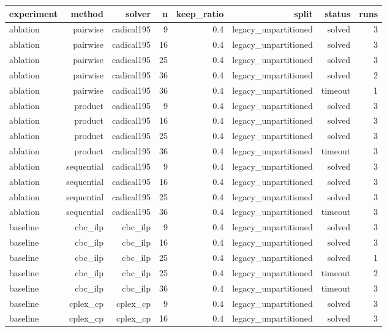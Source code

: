 \begin{tabular}{lrrrrrrr}
\toprule
experiment & method & solver & n & keep\_ratio & split & status & runs \\
\midrule
ablation & pairwise & cadical195 & 9 & 0.4 & legacy\_unpartitioned & solved & 3 \\
ablation & pairwise & cadical195 & 16 & 0.4 & legacy\_unpartitioned & solved & 3 \\
ablation & pairwise & cadical195 & 25 & 0.4 & legacy\_unpartitioned & solved & 3 \\
ablation & pairwise & cadical195 & 36 & 0.4 & legacy\_unpartitioned & solved & 2 \\
ablation & pairwise & cadical195 & 36 & 0.4 & legacy\_unpartitioned & timeout & 1 \\
ablation & product & cadical195 & 9 & 0.4 & legacy\_unpartitioned & solved & 3 \\
ablation & product & cadical195 & 16 & 0.4 & legacy\_unpartitioned & solved & 3 \\
ablation & product & cadical195 & 25 & 0.4 & legacy\_unpartitioned & solved & 3 \\
ablation & product & cadical195 & 36 & 0.4 & legacy\_unpartitioned & timeout & 3 \\
ablation & sequential & cadical195 & 9 & 0.4 & legacy\_unpartitioned & solved & 3 \\
ablation & sequential & cadical195 & 16 & 0.4 & legacy\_unpartitioned & solved & 3 \\
ablation & sequential & cadical195 & 25 & 0.4 & legacy\_unpartitioned & solved & 3 \\
ablation & sequential & cadical195 & 36 & 0.4 & legacy\_unpartitioned & timeout & 3 \\
baseline & cbc\_ilp & cbc\_ilp & 9 & 0.4 & legacy\_unpartitioned & solved & 3 \\
baseline & cbc\_ilp & cbc\_ilp & 16 & 0.4 & legacy\_unpartitioned & solved & 3 \\
baseline & cbc\_ilp & cbc\_ilp & 25 & 0.4 & legacy\_unpartitioned & solved & 1 \\
baseline & cbc\_ilp & cbc\_ilp & 25 & 0.4 & legacy\_unpartitioned & timeout & 2 \\
baseline & cbc\_ilp & cbc\_ilp & 36 & 0.4 & legacy\_unpartitioned & timeout & 3 \\
baseline & cplex\_cp & cplex\_cp & 9 & 0.4 & legacy\_unpartitioned & solved & 3 \\
baseline & cplex\_cp & cplex\_cp & 16 & 0.4 & legacy\_unpartitioned & solved & 3 \\

\end{tabular}

